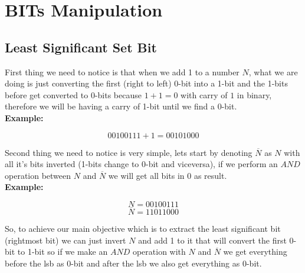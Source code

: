 \documentclass[twoside]{book}
\begin{document}


\thispagestyle{empty}
\cleardoublepage
\tableofcontents
\newpage
\thispagestyle{empty}
\cleardoublepage
\begin{multicols*}{2}
\end{multicols*}
\part*{BITs Manipulation}
{
\chapter*{Least Significant Set Bit}
}
\vspace{1em}
\sffamily
\bgroup

First thing we need to notice is that when we add 1 to a number $N$, what we are doing is just converting the first (right to left) 0-bit into a 1-bit and
the 1-bits before get converted to 0-bits because $1 + 1 = 0$ with carry of $1$ in binary, therefore we will be having a carry of 1-bit until we find a 0-bit.\\

\textbf{Example:}

$$00100111 + 1 = 00101000$$

Second thing we need to notice is very simple, lets start by denoting $\overline{N}$ as $N$ with all it's bits inverted (1-bits change to 0-bit and viceversa), if we perform an $AND$ operation between $N$ and $\overline{N}$ we will get all bits in $0$ as result.\\

\textbf{Example:}

$$N = 00100111$$
$$\overline{N} = 11011000$$

So, to achieve our main objective which is to extract the least significant bit (rightmost bit) we can just invert $N$ and add 1 to it that will convert the first 0-bit to 1-bit so if we make an $AND$ operation with $N$ and $\overline{N}$ we get everything before the lsb as 0-bit and after the lsb we also get everything as 0-bit.\\
\end{document}
